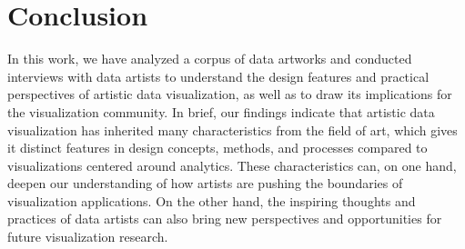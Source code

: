 \section{Conclusion}

In this work, we have analyzed a corpus of data artworks and conducted interviews with data artists to understand the design features and practical perspectives of artistic data visualization, as well as to draw its implications for the visualization community. In brief, our findings indicate that artistic data visualization has inherited many characteristics from the field of art, which gives it distinct features in design concepts, methods, and processes compared to visualizations centered around analytics. These characteristics can, on one hand, deepen our understanding of how artists are pushing the boundaries of visualization applications. On the other hand, the inspiring thoughts and practices of data artists can also bring new perspectives and opportunities for future visualization research.